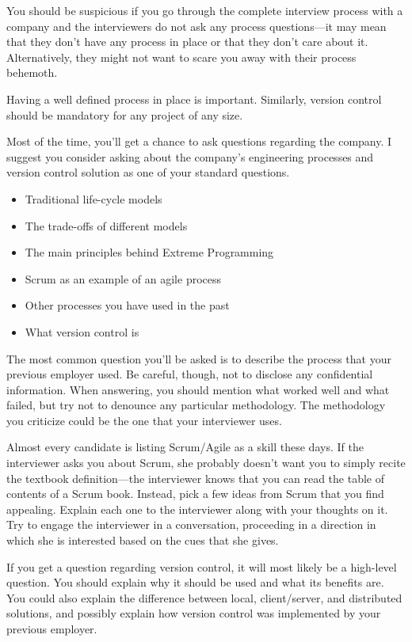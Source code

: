 
You should be suspicious if you go through the complete interview process with a company and the interviewers do not ask any process questions—it may mean that they don’t have any process in place or that they don’t care about it. Alternatively, they might not want to scare you away with their process behemoth.

Having a well defined process in place is important. Similarly, version control should be mandatory for any project of any size.

Most of the time, you’ll get a chance to ask questions regarding the company. I suggest you consider asking about the company’s engineering processes and version control solution as one of your standard questions.


\begin{itemize}
\item
Traditional life-cycle models

\item
The trade-offs of different models

\item
The main principles behind Extreme Programming

\item
Scrum as an example of an agile process

\item
Other processes you have used in the past

\item
What version control is
\end{itemize}


The most common question you’ll be asked is to describe the process that your previous employer used. Be careful, though, not to disclose any confidential information. When answering, you should mention what worked well and what failed, but try not to denounce any particular methodology. The methodology you criticize could be the one that your interviewer uses.

Almost every candidate is listing Scrum/Agile as a skill these days. If the interviewer asks you about Scrum, she probably doesn’t want you to simply recite the textbook definition—the interviewer knows that you can read the table of contents of a Scrum book. Instead, pick a few ideas from Scrum that you find appealing. Explain each one to the interviewer along with your thoughts on it. Try to engage the interviewer in a conversation, proceeding in a direction in which she is interested based on the cues that she gives.

If you get a question regarding version control, it will most likely be a high-level question. You should explain why it should be used and what its benefits are. You could also explain the difference between local, client/server, and distributed solutions, and possibly explain how version control was implemented by your previous employer.

